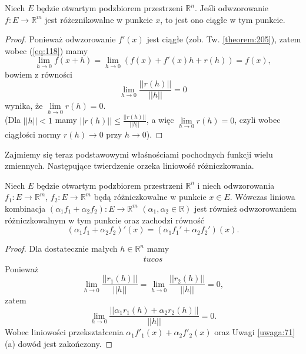 \documentclass[leqno]{article}
\begin{document}
\begin{justify}
\begin{wniosek}
{
    Niech $E$ będzie otwartym podzbiorem przestrzeni $\mathbb{R}^n$. Jeśli odwzorowanie $f : E \to \mathbb{R}^m$ jest 
    różcznikowalne w punkcie $x$, to jest ono ciągłe w tym punkcie.
}
\end{wniosek}

\begin{proof}
    Ponieważ odwzorowanie $f'(x)$ jest ciągłe (zob. Tw. \ref{theorem:205}), zatem wobec (\ref{eq:118})
    mamy 
    \[
        \lim\limits_{h \to 0}f(x+h) = \lim\limits_{h \to 0}(f(x) + f'(x)h + r(h)) = f(x),
    \]
    bowiem z równości 
    \[
        \lim\limits_{h \to 0} \frac{||r(h)||}{||h||} = 0
    \]
    wynika, że $\lim\limits_{h \to 0}r(h) = 0$. \\
    (Dla $||h|| < 1$ mamy $||r(h)|| \leqslant \frac{||r(h)||}{||h||}$, a więc $\lim\limits_{h \to 0}r(h) = 0$,
    czyli wobec ciągłości normy $r(h) \to 0$ przy $h \to 0$).
\end{proof}

Zajmiemy się teraz podstawowymi właśnościami pochodnych funkcji wielu zmiennych. Następujące
twierdzenie orzeka liniowość różniczkowania.

\begin{theorem}
{
    Niech $E$ będzie otwartym podzbiorem przestrzeni $\mathbb{R}^n$ i niech odwzorowania $f_1 : E \to \mathbb{R}^m$, $f_2 : E \to \mathbb{R}^m$
    będą różniczkowalne w punkcie $x \in E$.
    Wówczas liniowa kombinacja $(\alpha_1 f_1 + \alpha_2 f_2) : E \to \mathbb{R}^m$ $(\alpha_1, \alpha_2 \in \mathbb{R})$ jest
    również odwzorowaniem różniczkowalnym w tym punkcie oraz zachodzi równość 
    \[
        {(\alpha_1 f_1 + \alpha_2 f_2)}'(x) = (\alpha_1 f_1' + \alpha_2 f_2')(x).
    \]
}
\end{theorem}

\begin{proof}
    Dla dostatecznie małych $h \in \mathbb{R}^n$ mamy 
    \begin{align*}
        tucos
    \end{align*}
    Ponieważ
    \[
        \lim\limits_{h \to 0} \frac{||r_1(h)||}{||h||} =  \lim\limits_{h \to 0} \frac{||r_2(h)||}{||h||}= 0,
    \]
    zatem 
    \[
        \lim\limits_{h \to 0} \frac{||\alpha_1 r_1(h) + \alpha_2 r_2(h)||}{||h||} = 0.
    \]
    Wobec liniowości przekształcenia $\alpha_1 f'_1(x) + \alpha_2 f'_2(x)$ oraz Uwagi \ref{uwaga:71}
    (a) dowód jest zakończony.
\end{proof}


\end{justify}
\end{document}

